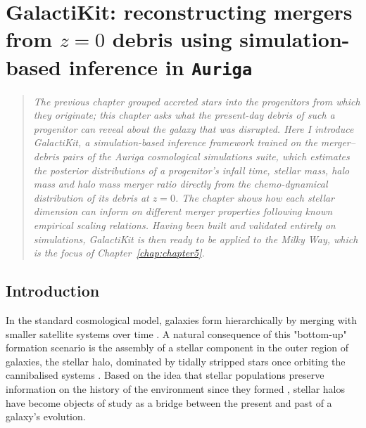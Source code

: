 ﻿%
\graphicspath{{Chapter_4_paper_folder/}}

\chapter{GalactiKit: reconstructing mergers from $z=0$ debris using simulation-based inference in \texttt{Auriga}}
\label{chap:chapter4}

\begin{quote}
\itshape
The previous chapter grouped accreted stars into the progenitors from which they originate;
this chapter asks what the present-day debris of such a progenitor can reveal about the galaxy
that was disrupted.
Here I introduce GalactiKit, a simulation-based inference framework trained
on the merger--debris pairs of the Auriga cosmological simulations suite,
which estimates the posterior distributions of a progenitor's infall time,
stellar mass, halo mass and halo mass merger ratio directly from the chemo-dynamical
distribution of its debris at $z=0$. The chapter shows how each stellar dimension can
inform on different merger properties following known empirical scaling relations.
Having been built and validated entirely on simulations, GalactiKit is then ready to be
applied to the Milky Way, which is the focus of Chapter~\ref{chap:chapter5}.
\end{quote}

\section{Introduction}
\label{sec:Intro}


In the standard cosmological model, galaxies form hierarchically by merging with smaller satellite systems over time \citep{White1978}. A natural consequence of this "bottom-up" formation scenario is the assembly of a stellar component in the outer region of galaxies, the stellar halo, dominated by tidally stripped stars once orbiting the cannibalised systems \citep{Searle1978}. Based on the idea that stellar populations preserve information on the history of the environment since they formed \citep{Eggen1962,Searle1978}, stellar halos have become objects of study as a bridge between the present and past of a galaxy's evolution. 

